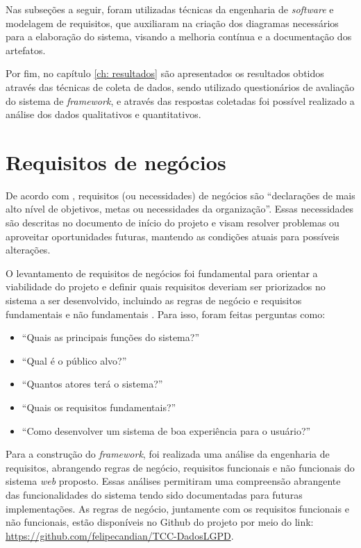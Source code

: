 \documentclass[
	12pt,				%
	openright,			%
	oneside,			%
	a4paper,			%
	english,			%
	french,				%
	spanish,			%
	brazil,				%
	]{abntex2}
\begin{document}
Nas subseções a seguir, foram utilizadas técnicas da engenharia de \textit{software} e modelagem de requisitos, que auxiliaram na criação dos diagramas necessários para a elaboração do sistema, visando a melhoria contínua e a documentação dos artefatos.

 Por fim, no capítulo \ref{ch: resultados} são apresentados os resultados obtidos através das técnicas de coleta de dados, sendo utilizado questionários de avaliação do sistema de \textit{framework}, e através das respostas coletadas foi possível realizado a análise dos dados qualitativos e quantitativos. 



\section{Requisitos de negócios}

De acordo com , requisitos (ou necessidades) de negócios são “declarações de mais alto nível de objetivos, metas ou necessidades da organização”. Essas necessidades são descritas no documento de início do projeto e visam resolver problemas ou aproveitar oportunidades futuras, mantendo as condições atuais para possíveis alterações.

O levantamento de requisitos de negócios foi fundamental para orientar a viabilidade do projeto e definir quais requisitos deveriam ser priorizados no sistema a ser desenvolvido, incluindo as regras de negócio e requisitos fundamentais e não fundamentais \cite{Vazquez2016}. Para isso, foram feitas perguntas como:

\begin{itemize}
\item “Quais as principais funções do sistema?”
\item “Qual é o público alvo?”
\item “Quantos atores terá o sistema?”
\item “Quais os requisitos fundamentais?”
\item “Como desenvolver um sistema de boa experiência para o usuário?”
\end{itemize}

Para a construção do \textit{framework}, foi realizada uma análise da engenharia de requisitos, abrangendo regras de negócio, requisitos funcionais e não funcionais do sistema \textit{web} proposto. Essas análises permitiram uma compreensão abrangente das funcionalidades do sistema tendo sido documentadas para futuras implementações. As regras de negócio, juntamente com os requisitos funcionais e não funcionais, estão disponíveis no Github do projeto por meio do link: \url{https://github.com/felipecandian/TCC-DadosLGPD}.
\end{document}
